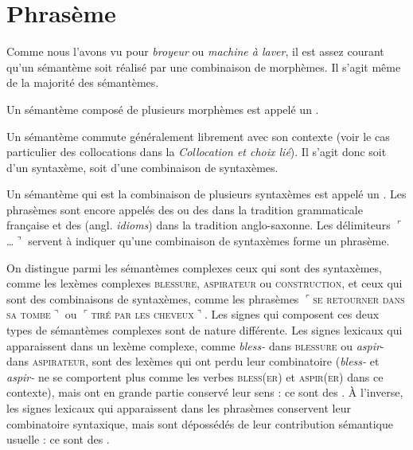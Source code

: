 \section{Phrasème}\label{sec:2.3.7}

Comme nous l’avons vu pour \textit{broyeur} ou \textit{machine à laver}, il est assez courant qu’un sémantème soit réalisé par une combinaison de morphèmes. Il s’agit même de la majorité des sémantèmes.

{Un sémantème composé de plusieurs morphèmes est appelé un .}

Un sémantème commute généralement librement avec son contexte (voir le cas particulier des collocations dans la  \textit{Collocation et choix lié}). Il s’agit donc soit d’un syntaxème, soit d’une combinaison de syntaxèmes.

{Un sémantème qui est la combinaison de plusieurs syntaxèmes est appelé un . Les phrasèmes sont encore appelés des  ou des  dans la tradition grammaticale française et des  (angl. \textit{idioms}) dans la tradition anglo-saxonne. Les délimiteurs $⌜$…$⌝$ servent à indiquer qu’une combinaison de syntaxèmes forme un phrasème.}

On distingue parmi les sémantèmes complexes ceux qui sont des syntaxèmes, comme les lexèmes complexes \textsc{blessure,} \textsc{aspirateur} ou \textsc{construction,} et ceux qui sont des combinaisons de syntaxèmes, comme les phrasèmes $⌜$\textsc{se} \textsc{retourner} \textsc{dans} \textsc{sa} \textsc{tombe}$⌝$ ou $⌜$\textsc{tiré} \textsc{par} \textsc{les} \textsc{cheveux}$⌝$. Les signes qui composent ces deux types de sémantèmes complexes sont de nature différente. Les signes lexicaux qui apparaissent dans un lexème complexe, comme \textit{bless-} dans \textsc{blessure} ou \textit{aspir}{}- dans \textsc{aspirateur}, sont des lexèmes qui ont perdu leur combinatoire (\textit{bless-} et \textit{aspir-} ne se comportent plus comme les verbes \textsc{bless}(\textsc{er}) et \textsc{aspir}(\textsc{er}) dans ce contexte), mais ont en grande partie conservé leur sens : ce sont des . À l’inverse, les signes lexicaux qui apparaissent dans les phrasèmes conservent leur combinatoire syntaxique, mais sont dépossédés de leur contribution sémantique usuelle : ce sont des .

